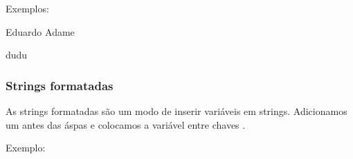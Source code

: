 \documentclass[letterpaper,10pt,english]{jupyterBook}
\begin{document}
\sphinxAtStartPar
Exemplos:

\begin{sphinxVerbatim}[commandchars=\\\{\}]
  
\end{sphinxVerbatim}

\begin{sphinxVerbatim}[commandchars=\\\{\}]
\PYGZsq{}Eduardo Adame\PYGZsq{}
\end{sphinxVerbatim}

\begin{sphinxVerbatim}[commandchars=\\\{\}]
\end{sphinxVerbatim}

\begin{sphinxVerbatim}[commandchars=\\\{\}]
\PYGZsq{}dudu\PYGZsq{}
\end{sphinxVerbatim}


\subsubsection{Strings formatadas}
\label{\detokenize{chapters/2:strings-formatadas}}
\sphinxAtStartPar
As strings formatadas são um modo de inserir variáveis em strings. Adicionamos um  antes das áspas e colocamos a variável entre chaves \sphinxcode{\sphinxupquote{\{\}}}.

\sphinxAtStartPar
Exemplo:

\begin{sphinxVerbatim}[commandchars=\\\{\}]
  
  
  
\end{sphinxVerbatim}
\end{document}
